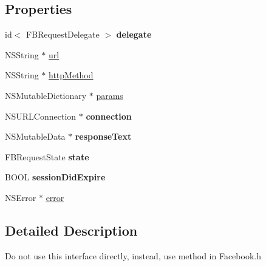 \subsection*{Properties}
\begin{DoxyCompactItemize}
\item 
\mbox{\label{categoryFBRequest_07Deprecated_08_ada8e5967d9f8f17fca3fe89eb00e98bb}} 
id$<$ F\+B\+Request\+Delegate $>$ {\bfseries delegate}
\item 
N\+S\+String $\ast$ \hyperlink{categoryFBRequest_07Deprecated_08_ac05e6fc5503b9806a900c423ce1f65d5}{url}
\item 
N\+S\+String $\ast$ \hyperlink{categoryFBRequest_07Deprecated_08_af74fe5bc235b8895dbe0f051239649d6}{http\+Method}
\item 
N\+S\+Mutable\+Dictionary $\ast$ \hyperlink{categoryFBRequest_07Deprecated_08_abc65f409227938e45243e9aa31c3f1d5}{params}
\item 
\mbox{\label{categoryFBRequest_07Deprecated_08_a00bafc9661bbaea656bfc38f77220eab}} 
N\+S\+U\+R\+L\+Connection $\ast$ {\bfseries connection}
\item 
\mbox{\label{categoryFBRequest_07Deprecated_08_ab7b9305a106ab823c4f4a262fadeff9b}} 
N\+S\+Mutable\+Data $\ast$ {\bfseries response\+Text}
\item 
\mbox{\label{categoryFBRequest_07Deprecated_08_aa0f292c25cc25f3cca94f3b4b5d9ac79}} 
F\+B\+Request\+State {\bfseries state}
\item 
\mbox{\label{categoryFBRequest_07Deprecated_08_a86c9b764a9eb7e908119839cb2e7afcb}} 
B\+O\+OL {\bfseries session\+Did\+Expire}
\item 
N\+S\+Error $\ast$ \hyperlink{categoryFBRequest_07Deprecated_08_aa77c503e3a8a4141487e3593fc285927}{error}
\end{DoxyCompactItemize}


\subsection{Detailed Description}
Do not use this interface directly, instead, use method in Facebook.\+h 

